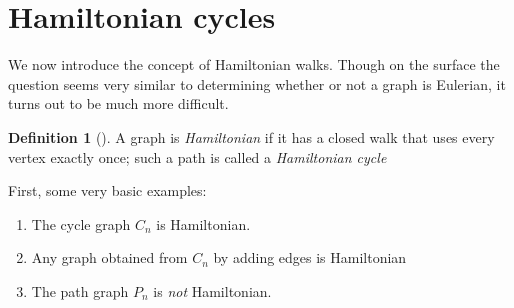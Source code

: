 \documentclass[10pt,]{book}
\theoremstyle{plain}
\theoremstyle{definition}
\newtheorem{definition}[theorem]{Definition}
\theoremstyle{definition}
\theoremstyle{definition}
\theoremstyle{definition}
\numberwithin{equation}{section}
\begin{document}
\section[{Hamiltonian cycles}]{Hamiltonian cycles}\label{s_walks_hamiltonian}
\hypertarget{p-143}{}%
We now introduce the concept of Hamiltonian walks. Though on the surface the question seems very similar to determining whether or not a graph is Eulerian, it turns out to be much more difficult.%
\begin{definition}[{}]\label{definition-17}
\hypertarget{p-144}{}%
A graph is \emph{Hamiltonian} if it has a closed walk that uses every vertex exactly once; such a path is called a \emph{Hamiltonian cycle}%
\end{definition}
\hypertarget{p-145}{}%
First, some very basic examples:%
\leavevmode%
\begin{enumerate}
\item\hypertarget{li-31}{}The cycle graph \(C_n\) is Hamiltonian.%
\item\hypertarget{li-32}{}Any graph obtained from \(C_n\) by adding edges is Hamiltonian%
\item\hypertarget{li-33}{}The path graph \(P_n\) is \emph{not} Hamiltonian.%
\end{enumerate}
\end{document}
